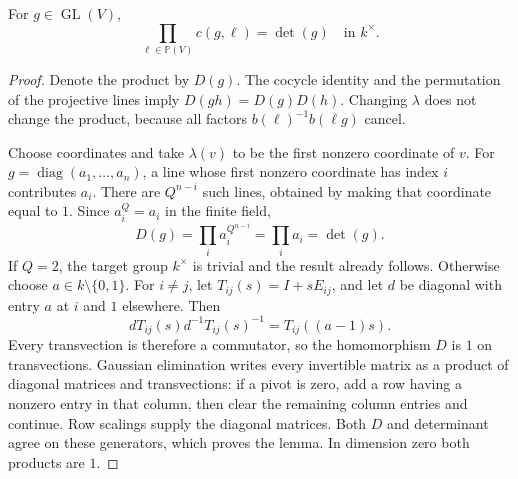 \begin{lemma}\label{sf-determinant}
For \(g\in\operatorname{GL}(V)\),
\[
                 \prod_{\ell\in\mathbb P(V)}c(g,\ell)
                              =\det(g)\quad\text{in }k^\times.
\]
\end{lemma}
\begin{proof}
Denote the product by \(D(g)\).
The cocycle identity and the permutation of the
projective lines imply \(D(gh)=D(g)D(h)\).
Changing \(\lambda\) does not change the product,
because all factors \(b(\ell)^{-1}b(\ell g)\) cancel.

Choose coordinates and take \(\lambda(v)\) to be
the first nonzero coordinate of \(v\).
For \(g=\operatorname{diag}(a_1,\ldots,a_n)\), a line
whose first nonzero coordinate has index \(i\)
contributes \(a_i\).  There are \(Q^{n-i}\) such
lines, obtained by making that coordinate equal
to \(1\).  Since \(a_i^Q=a_i\) in the finite field,
\[
                      D(g)=\prod_i a_i^{Q^{n-i}}
                            =\prod_i a_i=\det(g).
\]
If \(Q=2\), the target group \(k^\times\) is
trivial and the result already follows.
Otherwise choose \(a\in k\setminus\{0,1\}\).
For \(i\ne j\), let \(T_{ij}(s)=I+sE_{ij}\),
and let \(d\) be diagonal with entry \(a\) at
\(i\) and \(1\) elsewhere.  Then
\[
      dT_{ij}(s)d^{-1}T_{ij}(s)^{-1}=T_{ij}((a-1)s).
\]
Every transvection is therefore a commutator, so
the homomorphism \(D\) is \(1\) on transvections.
Gaussian elimination writes every invertible matrix
as a product of diagonal matrices and transvections:
if a pivot is zero, add a row having a nonzero entry
in that column, then clear the remaining column
entries and continue.  Row scalings supply the
diagonal matrices.
Both \(D\) and determinant agree on these generators,
which proves the lemma.  In dimension zero both
products are \(1\).
\end{proof}

